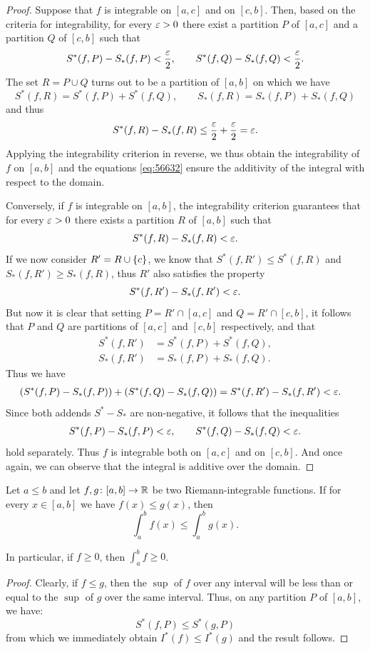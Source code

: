 \begin{proof}
\mymark{*}
Suppose that $f$ is integrable on $[a,c]$ and on $[c,b]$.
Then, based on the criteria for integrability, for every $\varepsilon>0$ there exist a
partition $P$ of $[a,c]$ and a partition $Q$ of $[c,b]$ such that
\[
  S^*(f,P) - S_*(f,P) < \frac {\varepsilon} 2,
  \qquad
  S^*(f,Q) - S_*(f,Q) < \frac {\varepsilon} 2.
\]
The set $R=P\cup Q$ turns out to be a partition of $[a,b]$ on which we have
\begin{equation}\label{eq:56632}
S^*(f,R) = S^*(f,P) + S^*(f,Q), \qquad
S_*(f,R) = S_*(f,P) + S_*(f,Q)
\end{equation}
and thus
\[
S^*(f,R) - S_*(f,R) \le \frac {\varepsilon} 2 + \frac {\varepsilon} 2 = \varepsilon.
\]
Applying the integrability criterion in reverse, we thus obtain
the integrability of $f$ on $[a,b]$ and the equations
\eqref{eq:56632} ensure the additivity of the integral with respect to the domain.

Conversely, if $f$ is integrable on $[a,b]$, the integrability criterion
guarantees that for every $\varepsilon>0$ there exists a partition $R$ of $[a,b]$ such
that
\[
S^*(f,R) - S_*(f,R) < \varepsilon.
\]
If we now consider $R' = R \cup {\left\{ c \right\}}$, we know that $S^*(f,R') \le
S^*(f,R)$
and $S_*(f,R') \ge S_*(f,R)$, thus $R'$ also satisfies the property
\[
S^*(f,R') - S_*(f,R') < \varepsilon.
\]
But now it is clear that setting $P=R'\cap[a,c]$ and $Q=R'\cap[c,b]$, it follows
that $P$
and $Q$ are partitions of $[a,c]$ and $[c,b]$ respectively, and that
\begin{align*}
  S^*(f,R') &= S^*(f,P) + S^*(f,Q), \\
  S_*(f,R') &= S_*(f,P) + S_*(f,Q).
\end{align*}
Thus we have
\begin{align*}
(S^*(f,P) - S_*(f,P)) + (S^*(f,Q) - S_*(f,Q))
&= S^*(f,R') - S_*(f,R')
< \varepsilon.
\end{align*}
Since both addends $S^*-S_*$ are non-negative,
it follows that the inequalities
\[
S^*(f,P) - S_*(f,P) < \varepsilon, \qquad
S^*(f,Q) - S_*(f,Q) < \varepsilon.
\]
hold separately.
Thus $f$ is integrable both on $[a,c]$ and on $[c,b]$.
And once again, we can observe that the integral is additive over the domain.
\end{proof}  

\begin{theorem}%
\label{th:monotonia_integrale}%
\mymark{*}%
Let $a\le b$ and let
$f,g\colon [a,b]\to {\mathbb R}$ be two Riemann-integrable functions.
If for every $x\in [a,b]$ we have $f(x) \le g(x)$, then
\[
  \int_a^b f(x) \le \int_a^b g(x).
\]

In particular, if $f\ge 0$, then $\int_a^b f \ge 0$.
\end{theorem}
%
\begin{proof}
Clearly, if $f \le g$, then the $\sup$ of $f$ over any interval will be less
than or equal to the $\sup$ of $g$ over the same interval. Thus, on any
partition $P$ of $[a,b]$, we have:
\[
  S^*(f,P) \le S^*(g,P)
\]
from which we immediately obtain $I^*(f) \le I^*(g)$ and the result follows.
\end{proof}

